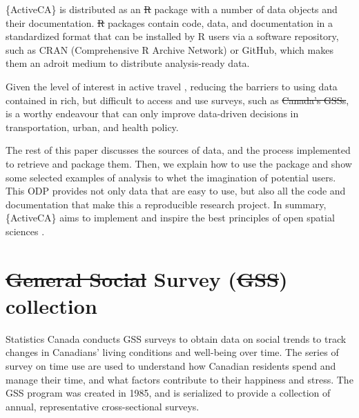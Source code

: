 \documentclass[Royal,times,sageh]{sagej}
\providecommand{\DIFaddtex}[1]{{\protect\color{blue}\uwave{#1}}} %
\providecommand{\DIFdeltex}[1]{{\protect\color{red}\sout{#1}}} %
\providecommand{\DIFaddbegin}{} %
\providecommand{\DIFaddend}{} %
\providecommand{\DIFdelbegin}{} %
\providecommand{\DIFdelend}{} %
\providecommand{\DIFadd}[1]{\texorpdfstring{\DIFaddtex{#1}}{#1}} %
\providecommand{\DIFdel}[1]{\texorpdfstring{\DIFdeltex{#1}}{}} %
\begin{document}
\{ActiveCA\} is distributed as an \DIFdelbegin \DIFdel{R }\DIFdelend \DIFaddbegin \texttt{\DIFadd{R}} \DIFaddend package with a number of
data objects and their documentation. \DIFdelbegin \DIFdel{R }\DIFdelend \DIFaddbegin \texttt{\DIFadd{R}} \DIFaddend packages contain code,
data, and documentation in a standardized format that can be installed
by R users via a software repository, such as CRAN (Comprehensive R
Archive Network) or GitHub, which makes them an adroit medium to
distribute analysis-ready data.

Given the level of interest in active travel
\citep[e.g.,][]{mccurdySupport2023}, reducing the barriers to using data
contained in rich, but difficult to access and use surveys, such as \DIFdelbegin \DIFdel{Canada's GSSs}\DIFdelend \DIFaddbegin \DIFadd{TUS}\DIFaddend ,
is a worthy endeavour that can only improve data-driven decisions in
transportation, urban, and health policy.

The rest of this paper discusses the sources of data, and the process
implemented to retrieve and package them. Then, we explain how to use
the package and show some selected examples of analysis to whet the
imagination of potential users. This ODP provides not only data that are
easy to use, but also all the code and documentation that make this a
reproducible research project. In summary, \{ActiveCA\} aims to
implement and inspire the best principles of open spatial sciences
\citep{paez_open_2021, brunsdon_opening_2021}.

\section{\DIFdelbegin \DIFdel{General Social }\DIFdelend \DIFaddbegin \DIFadd{The Time Use }\DIFaddend Survey (\DIFdelbegin \DIFdel{GSS}\DIFdelend \DIFaddbegin \DIFadd{TUS}\DIFaddend )
collection}\DIFdelbegin %
\DIFdelend \DIFaddbegin \label{the-time-use-survey-tus-collection}
\DIFaddend 

Statistics Canada \citeyearpar{statisticscanada2024} conducts GSS
surveys to obtain data on social trends to track changes in Canadians'
living conditions and well-being over time. The series of survey on time
use are used to understand how Canadian residents spend and manage their
time, and what factors contribute to their happiness and stress. The GSS
program was created in 1985, and is serialized to provide a collection
of annual, representative cross-sectional surveys.
\end{document}

